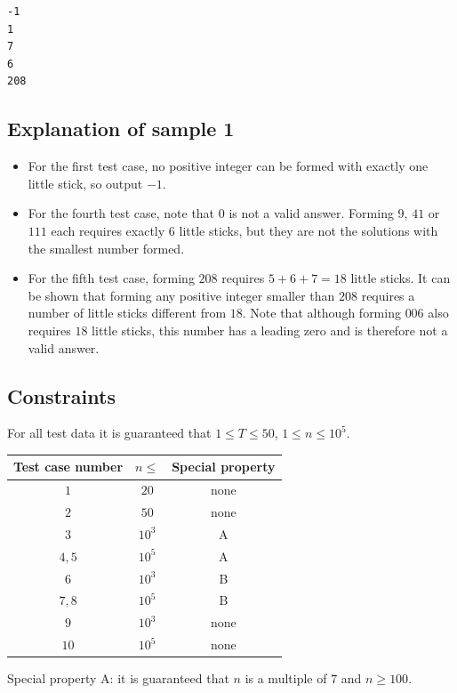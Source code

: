 \documentclass[11pt]{article}
\begin{document}
\begin{verbatim}
-1
1
7
6
208
\end{verbatim}

\subsection*{Explanation of sample 1}

\begin{itemize}
\item For the first test case, no positive integer can be formed with
exactly one little stick, so output $-1$.
\item For the fourth test case, note that $0$ is not a valid answer.
Forming $9$, $41$ or $111$ each requires exactly $6$ little sticks, but
they are not the solutions with the smallest number formed.
\item For the fifth test case, forming $208$ requires $5 + 6 + 7 = 18$
little sticks.
It can be shown that forming any positive integer smaller than $208$
requires a number of little sticks different from $18$.
Note that although forming $006$ also requires $18$ little sticks, this
number has a leading zero and is therefore not a valid answer.
\end{itemize}

\subsection*{Constraints}

For all test data it is guaranteed that $1 \leq T \leq 50$,
$1 \leq n \leq 10^5$.

\begin{center}
\begin{tabular}{ccc}
\toprule
Test case number & $n \leq$ & Special property \\
\midrule
$1$ & $20$ & none \\
$2$ & $50$ & none \\
$3$ & $10^3$ & A \\
$4, 5$ & $10^5$ & A \\
$6$ & $10^3$ & B \\
$7, 8$ & $10^5$ & B \\
$9$ & $10^3$ & none \\
$10$ & $10^5$ & none \\
\bottomrule
\end{tabular}
\end{center}

Special property A: it is guaranteed that $n$ is a multiple of $7$ and
$n \geq 100$.
\end{document}
